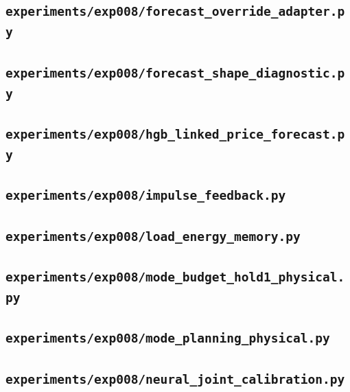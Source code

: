 \subsection*{\nolinkurl{experiments/exp008/forecast_override_adapter.py}}


\subsection*{\nolinkurl{experiments/exp008/forecast_shape_diagnostic.py}}


\subsection*{\nolinkurl{experiments/exp008/hgb_linked_price_forecast.py}}


\subsection*{\nolinkurl{experiments/exp008/impulse_feedback.py}}


\subsection*{\nolinkurl{experiments/exp008/load_energy_memory.py}}


\subsection*{\nolinkurl{experiments/exp008/mode_budget_hold1_physical.py}}


\subsection*{\nolinkurl{experiments/exp008/mode_planning_physical.py}}


\subsection*{\nolinkurl{experiments/exp008/neural_joint_calibration.py}}


